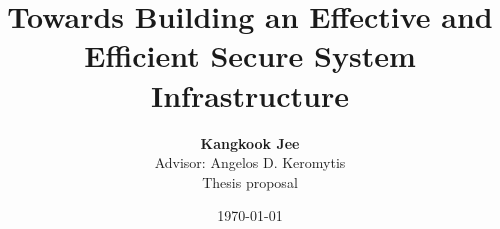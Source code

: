 \documentclass[12pt]{article}
\title{Towards Building an Effective and Efficient Secure System
Infrastructure}
\author{ {\bf Kangkook Jee}   \\
Advisor: Angelos D. Keromytis \\
Thesis proposal\\
}
\date{\today}
\begin{document}
\pagestyle{plain}
\maketitle

\pagebreak


\pagebreak
\tableofcontents
\pagebreak




\cleardoublepage
{}

\pagebreak

\begin{footnotesize}


\end{footnotesize}
\end{document}
